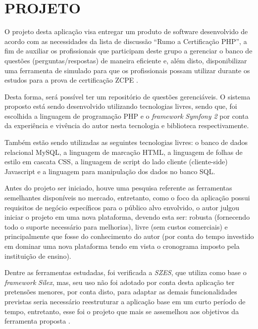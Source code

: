 \chapter{PROJETO}
\label{chp:projeto}
 
O projeto desta aplicação visa entregar um produto de software
desenvolvido de acordo com as necessidades da lista de discussão ``Rumo a
Certificação PHP'', a fim de auxiliar os profissionais que participam deste
grupo a gerenciar o banco de questões (perguntas/respostas) de maneira eficiente e,
além disto, disponibilizar uma ferramenta de simulado para que os profissionais 
possam utilizar durante os estudos para a prova de certificação \acs{ZCPE}
\cite{googleGroupsRumoACertificaoPHP}.

Desta forma, será possível ter um repositório de questões gerenciáveis. O
sistema proposto está sendo desenvolvido utilizando tecnologias livres, sendo 
que, foi escolhida a linguagem de programação \acs{PHP} e o
\textit{framework} \textit{Symfony 2} por conta da experiência e vivência do
autor nesta tecnologia e biblioteca respectivamente.

Também estão sendo utilizadas as seguintes tecnologias livres: o banco de dados
relacional MySQL, a linguagem de marcação HTML, a linguagem de folhas de estilo 
em cascata CSS,  a linguagem de script do lado cliente (cliente-side) Javascript 
e a linguagem para manipulação dos dados no banco SQL.

Antes do projeto ser iniciado, houve uma pesquisa referente as ferramentas
semelhantes disponíveis no mercado, entretanto, como o foco da aplicação possui
requisitos de negócio específicos para o público alvo envolvido, o autor julgou
iniciar o projeto em uma nova plataforma, devendo esta ser: robusta (fornecendo
todo o suporte necessário para melhorias), livre (sem custos comerciais) e
principalmente que fosse do conhecimento do autor (por conta do tempo investido
em dominar uma nova plataforma tendo em vista o cronograma imposto pela
instituição de ensino).

Dentre as ferramentas estudadas, foi
verificada a \textit{SZES}, que utiliza como base o \textit{framework}
\textit{Silex}, mas, seu uso não foi adotado por conta desta aplicação
ter pretensões menores, por conta disto, para adaptar as demais funcionalidades
previstas seria necessário reestruturar a aplicação
base em um curto período de tempo, entretanto, esse foi o projeto que mais se
assemelhou aos objetivos da ferramenta proposta \cite{githubSZES}.

